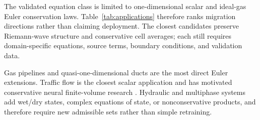 \documentclass[10pt,twocolumn]{article}
\begin{document}
\begin{minipage}[t]{0.44\textwidth}
The validated equation class is limited to one-dimensional scalar and ideal-gas Euler conservation laws. Table~\ref{tab:applications} therefore ranks migration directions rather than claiming deployment. The closest candidates preserve Riemann-wave structure and conservative cell averages; each still requires domain-specific equations, source terms, boundary conditions, and validation data.

Gas pipelines and quasi-one-dimensional ducts are the most direct Euler extensions. Traffic flow is the closest scalar application and has motivated conservative neural finite-volume research \citep{lichtle2025unfv}. Hydraulic and multiphase systems add wet/dry states, complex equations of state, or nonconservative products, and therefore require new admissible sets rather than simple retraining.
\end{minipage}\hfill
\end{document}
